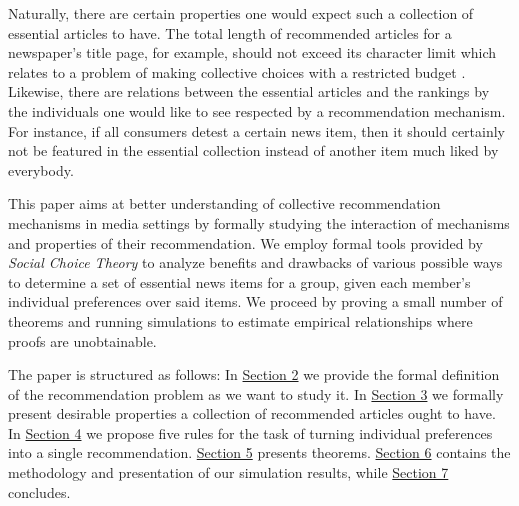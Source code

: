 \documentclass{article}
\begin{document}
Naturally, there are certain properties one would expect such a collection of essential articles to have.
 The total length of recommended articles for a newspaper's title page, for example, should not exceed its character limit which relates to a problem of making collective choices with a restricted budget \cite{lu2011budgeted}.
 Likewise, there are relations between the essential articles and the rankings by the individuals one would like to see respected by a recommendation mechanism.
For instance, if all consumers detest a certain news item,
 then it should certainly not be featured in the essential collection instead of another item much liked by everybody.

This paper aims at better understanding of collective recommendation mechanisms in media settings by
formally studying the interaction of mechanisms and properties of their recommendation.
We employ formal tools provided by {\em Social Choice Theory} to analyze benefits and drawbacks of various possible ways to determine a set of essential news items
for a group, given each member's individual preferences over said items.
We proceed by proving a small number of theorems and running simulations to estimate empirical relationships where proofs are unobtainable.

The paper is structured as follows: In \hyperlink{framework}{Section 2} we provide the formal definition of the recommendation problem as we want to study it.
In \hyperlink{axioms}{Section 3} we formally present desirable properties a collection of recommended articles ought to have.
In \hyperlink{rules}{Section  4} we propose five rules for the task of turning individual preferences into a single recommendation. \hyperlink{proofs}{Section 5} presents theorems.
\hyperlink{simulations}{Section 6} contains the methodology and presentation of our simulation results, while
\hyperlink{conclusion}{Section 7} concludes.




\end{document}
